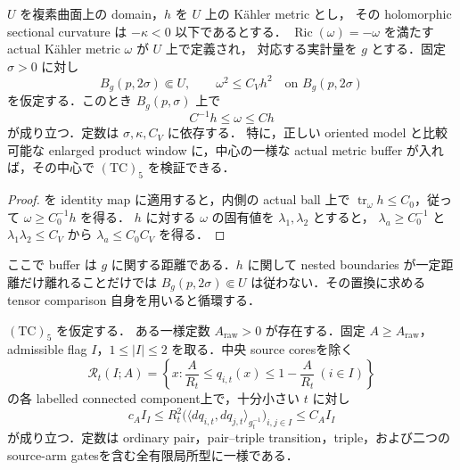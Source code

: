 \documentclass[a4paper,11pt]{ltjsarticle}
\numberwithin{equation}{section}
\theoremstyle{plain}
\theoremstyle{definition}
\theoremstyle{remark}
\newcommand{\Ric}{\operatorname{Ric}}\newcommand{\tr}{\operatorname{tr}}\newcommand{\osc}{\operatorname{osc}}\newcommand{\vol}{\operatorname{Vol}}
\begin{document}







\begin{lemma}\label{coarse:lem:actual-buffer-comparison}
$U$ を複素曲面上の domain，$h$ を $U$ 上の K\"ahler metric とし，
その holomorphic sectional curvature は $-\kappa<0$ 以下であるとする．
$\Ric(\omega)=-\omega$ を満たす actual K\"ahler metric $\omega$ が $U$ 上で定義され，
対応する実計量を $g$ とする．固定 $\sigma>0$ に対し
\[
 B_g(p,2\sigma)\Subset U,\qquad \omega^2\le C_V h^2
 \quad\text{on }B_g(p,2\sigma)
\]
を仮定する．このとき $B_g(p,\sigma)$ 上で
\[
 C^{-1}h\le\omega\le C h
\]
が成り立つ．定数は $\sigma,\kappa,C_V$ に依存する．
特に，正しい oriented model と比較可能な enlarged product window に，中心の一様な actual metric buffer が入れば，その中心で $\mathrm{(TC)}_5$ を検証できる．
\end{lemma}

\begin{proof}
 を identity map に適用すると，内側の actual ball 上で
$\tr_{\omega}h\le C_0$，従って $\omega\ge C_0^{-1}h$ を得る．
$h$ に対する $\omega$ の固有値を $\lambda_1,\lambda_2$ とすると，
$\lambda_a\ge C_0^{-1}$ と $\lambda_1\lambda_2\le C_V$ から
$\lambda_a\le C_0C_V$ を得る．
\end{proof}

\begin{remark}
ここで buffer は $g$ に関する距離である．$h$ に関して nested boundaries が一定距離だけ離れることだけでは
$B_g(p,2\sigma)\Subset U$ は従わない．その置換に求める tensor comparison 自身を用いると循環する．
\end{remark}

\begin{proposition}\label{coarse:prop:coarse-raw-submetry}
$\mathrm{(TC)}_5$ を仮定する．
ある一様定数 $A_{\mathrm{raw}}>0$ が存在する．固定 $A\ge A_{\mathrm{raw}}$，admissible flag $I$，$1\le|I|\le2$ を取る．中央 source coresを除く
\[
 \mathcal R_t(I;A)=\left\{x:\frac A{R_t}\le q_{i,t}(x)
 \le1-\frac A{R_t}\ (i\in I)\right\}
\]
の各 labelled connected component上で，十分小さい $t$ に対し
\begin{equation}\label{coarse:eq:coarse-cogram}
 c_A I_I\le
 R_t^2\bigl(\langle dq_{i,t},dq_{j,t}\rangle_{g_t^{-1}}\bigr)_{i,j\in I}
 \le C_A I_I
\end{equation}
が成り立つ．定数は ordinary pair，pair--triple transition，triple，および二つの source-arm gatesを含む全有限局所型に一様である．
\end{proposition}
\end{document}
